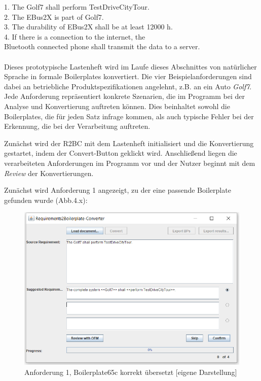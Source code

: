 \documentclass[12pt]{report}
\begin{document}
1. The Golf7 shall perform TestDriveCityTour.\\

2. The EBus2X is part of Golf7.\\

3. The durability of EBus2X shall be at least 12000 h.\\

4. If there is a connection to the internet, the \\Bluetooth connected phone shall transmit the data to a server.\\
\\ 

Dieses prototypische Lastenheft wird im Laufe dieses Abschnittes von natürlicher Sprache in formale Boilerplates konvertiert. Die vier Beispielanforderungen sind dabei an betriebliche Produktspezifikationen angelehnt, z.B. an ein Auto \textit{Golf7}. Jede Anforderung repräsentiert konkrete Szenarien, die im Programm bei der Analyse und Konvertierung auftreten können. Dies beinhaltet sowohl die Boilerplates, die für jeden Satz infrage kommen, als auch typische Fehler bei der Erkennung, die bei der Verarbeitung auftreten.

Zunächst wird der R2BC mit dem Lastenheft initialisiert und die Konvertierung gestartet, indem der Convert-Button geklickt wird. Anschließend liegen die verarbeiteten Anforderungen im Programm vor und der Nutzer beginnt mit dem \textit{Review} der Konvertierungen. 

Zunächst wird Anforderung 1 angezeigt, zu der eine passende Boilerplate gefunden wurde (Abb.4.x):

\begin{figure}[h!]
\begin{center}
\includegraphics[scale=0.7]{Bilder/GUI-req1.png}
\caption{Anforderung 1, Boilerplate65c korrekt übersetzt [eigene Darstellung]}
\end{center}
\end{figure}
\end{document}
